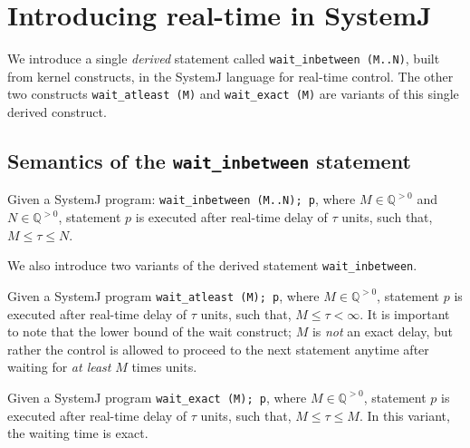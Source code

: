 \section{Introducing real-time in SystemJ}
\label{sec:intr-real-time}

We introduce a single \textit{derived} statement called
\mbox{\texttt{wait\_inbetween (M..N)}}, built from kernel constructs, in
the SystemJ language for real-time control. The other two constructs
\mbox{\texttt{wait\_atleast (M)}} and \mbox{\texttt{wait\_exact (M)}}
are variants of this single derived construct.



\subsection{Semantics of the \texttt{wait\_inbetween} statement}
\label{sec:semant-delay-stat}


Given a SystemJ program: \texttt{wait\_inbetween (M..N); p}, where $M
\in \mathbb{Q}^{>0}$ and $N \in \mathbb{Q}^{>0}$, statement $p$ is
executed after real-time delay of $\tau$ units, such that, $M \leq \tau
\leq N$.

We also introduce two variants of the derived statement
\texttt{wait\_inbetween}.
\begin{enumerate*}
\item Given a SystemJ program \texttt{wait\_atleast (M); p}, where $M
  \in \mathbb{Q}^{>0}$, statement $p$ is executed after real-time delay
  of $\tau$ units, such that, $M \leq \tau < \infty$. It is important to
  note that the lower bound of the wait construct; $M$ is \textit{not}
  an exact delay, but rather the control is allowed to proceed to the
  next statement anytime after waiting for \textit{at least} $M$ times
  units.
\item Given a SystemJ program \texttt{wait\_exact (M); p}, where $M
  \in \mathbb{Q}^{>0}$, statement $p$ is executed after real-time delay
  of $\tau$ units, such that, $M \leq \tau \leq M$. In this variant, the
  waiting time is exact.
\end{enumerate*}

